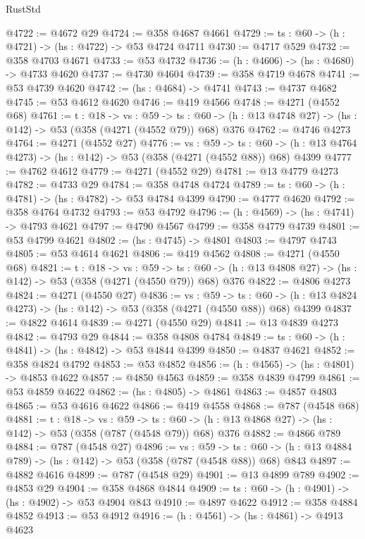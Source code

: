 \begin{lexlean}{RustStd}
\begin{coremodule}
@4722 := @4672 @29
@4724 := @358 @4687 @4661
@4729 := {ts : @60} -> (h : @4721) -> (hs : @4722) -> @53 @4724 @4711
@4730 := @4717 @529
@4732 := @358 @4703 @4671
@4733 := @53 @4732
@4736 := (h : @4606) -> (hs : @4680) -> @4733 @4620
@4737 := @4730 @4604
@4739 := @358 @4719 @4678
@4741 := @53 @4739 @4620
@4742 := (hs : @4684) -> @4741
@4743 := @4737 @4682
@4745 := @53 @4612 @4620
@4746 := @419 @4566
@4748 := @4271 (@4552 @68)
@4761 := {t : @18} ->
  {vs : @59} ->
  {ts : @60} -> (h : @13 @4748 @27) -> (hs : @142) -> @53 (@358 (@4271 (@4552 @79)) @68) @376
@4762 := @4746 @4273
@4764 := @4271 (@4552 @27)
@4776 := {vs : @59} ->
  {ts : @60} -> (h : @13 @4764 @4273) -> (hs : @142) -> @53 (@358 (@4271 (@4552 @88)) @68) @4399
@4777 := @4762 @4612
@4779 := @4271 (@4552 @29)
@4781 := @13 @4779 @4273
@4782 := @4733 @29
@4784 := @358 @4748 @4724
@4789 := {ts : @60} -> (h : @4781) -> (hs : @4782) -> @53 @4784 @4399
@4790 := @4777 @4620
@4792 := @358 @4764 @4732
@4793 := @53 @4792
@4796 := (h : @4569) -> (hs : @4741) -> @4793 @4621
@4797 := @4790 @4567
@4799 := @358 @4779 @4739
@4801 := @53 @4799 @4621
@4802 := (hs : @4745) -> @4801
@4803 := @4797 @4743
@4805 := @53 @4614 @4621
@4806 := @419 @4562
@4808 := @4271 (@4550 @68)
@4821 := {t : @18} ->
  {vs : @59} ->
  {ts : @60} -> (h : @13 @4808 @27) -> (hs : @142) -> @53 (@358 (@4271 (@4550 @79)) @68) @376
@4822 := @4806 @4273
@4824 := @4271 (@4550 @27)
@4836 := {vs : @59} ->
  {ts : @60} -> (h : @13 @4824 @4273) -> (hs : @142) -> @53 (@358 (@4271 (@4550 @88)) @68) @4399
@4837 := @4822 @4614
@4839 := @4271 (@4550 @29)
@4841 := @13 @4839 @4273
@4842 := @4793 @29
@4844 := @358 @4808 @4784
@4849 := {ts : @60} -> (h : @4841) -> (hs : @4842) -> @53 @4844 @4399
@4850 := @4837 @4621
@4852 := @358 @4824 @4792
@4853 := @53 @4852
@4856 := (h : @4565) -> (hs : @4801) -> @4853 @4622
@4857 := @4850 @4563
@4859 := @358 @4839 @4799
@4861 := @53 @4859 @4622
@4862 := (hs : @4805) -> @4861
@4863 := @4857 @4803
@4865 := @53 @4616 @4622
@4866 := @419 @4558
@4868 := @787 (@4548 @68)
@4881 := {t : @18} ->
  {vs : @59} ->
  {ts : @60} -> (h : @13 @4868 @27) -> (hs : @142) -> @53 (@358 (@787 (@4548 @79)) @68) @376
@4882 := @4866 @789
@4884 := @787 (@4548 @27)
@4896 := {vs : @59} ->
  {ts : @60} -> (h : @13 @4884 @789) -> (hs : @142) -> @53 (@358 (@787 (@4548 @88)) @68) @843
@4897 := @4882 @4616
@4899 := @787 (@4548 @29)
@4901 := @13 @4899 @789
@4902 := @4853 @29
@4904 := @358 @4868 @4844
@4909 := {ts : @60} -> (h : @4901) -> (hs : @4902) -> @53 @4904 @843
@4910 := @4897 @4622
@4912 := @358 @4884 @4852
@4913 := @53 @4912
@4916 := (h : @4561) -> (hs : @4861) -> @4913 @4623

\end{coremodule}
\end{lexlean}
